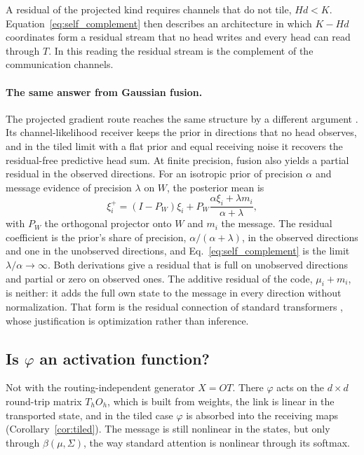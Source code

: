 \documentclass[11pt]{article}
\theoremstyle{definition}
\theoremstyle{remark}
\begin{document}
A residual of the projected kind requires channels that do not tile, $Hd<K$. Equation~\eqref{eq:self_complement} then describes an architecture in which $K-Hd$ coordinates form a residual stream that no head writes and every head can read through $T$. In this reading the residual stream is the complement of the communication channels.

\paragraph{The same answer from Gaussian fusion.}
The projected gradient route reaches the same structure by a different argument \cite{dennis2026projgrad}. Its channel-likelihood receiver keeps the prior in directions that no head observes, and in the tiled limit with a flat prior and equal receiving noise it recovers the residual-free predictive head sum. At finite precision, fusion also yields a partial residual in the observed directions. For an isotropic prior of precision $\alpha$ and message evidence of precision $\lambda$ on $W$, the posterior mean is
\begin{equation}
\xi_i^+=(I-P_W)\xi_i+P_W\frac{\alpha\xi_i+\lambda m_i}{\alpha+\lambda},
\label{eq:fusion_residual}
\end{equation}
with $P_W$ the orthogonal projector onto $W$ and $m_i$ the message. The residual coefficient is the prior's share of precision, $\alpha/(\alpha+\lambda)$, in the observed directions and one in the unobserved directions, and Eq.~\eqref{eq:self_complement} is the limit $\lambda/\alpha\to\infty$. Both derivations give a residual that is full on unobserved directions and partial or zero on observed ones. The additive residual of the code, $\mu_i+m_i$, is neither: it adds the full own state to the message in every direction without normalization. That form is the residual connection of standard transformers \cite{he2016resnet}, whose justification is optimization rather than inference.

\subsection{Is \texorpdfstring{$\varphi$}{phi} an activation function?}

Not with the routing-independent generator $X=OT$. There $\varphi$ acts on the $d\times d$ round-trip matrix $T_hO_h$, which is built from weights, the link is linear in the transported state, and in the tiled case $\varphi$ is absorbed into the receiving maps (Corollary~\ref{cor:tiled}). The message is still nonlinear in the states, but only through $\beta(\mu,\Sigma)$, the way standard attention is nonlinear through its softmax.
\end{document}

